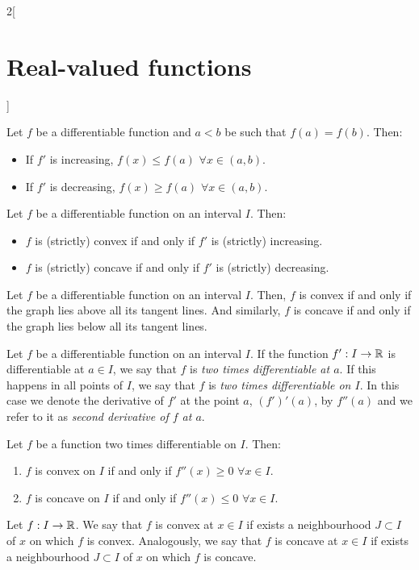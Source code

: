 \documentclass[../../../main.tex]{subfiles}
\begin{document}
\begin{multicols}{2}[\section{Real-valued functions}]
\begin{lemma}
    Let $f$ be a differentiable function and $a<b$ be such that $f(a)=f(b)$. Then:
    \begin{itemize}
      \item If $f'$ is increasing, $f(x)\leq f(a)$ $\forall x\in(a,b)$.
      \item If $f'$ is decreasing, $f(x)\geq f(a)$ $\forall x\in(a,b)$.
    \end{itemize}
  \end{lemma}
  \begin{theorem}
    Let $f$ be a differentiable function on an interval $I$. Then:
    \begin{itemize}
      \item $f$ is (strictly) convex if and only if $f'$ is (strictly) increasing.
      \item $f$ is (strictly) concave if and only if $f'$ is (strictly) decreasing.
    \end{itemize}
  \end{theorem}
  \begin{theorem}
    Let $f$ be a differentiable function on an interval $I$. Then, $f$ is convex if and only if the graph lies above all its tangent lines. And similarly, $f$ is concave if and only if the graph lies below all its tangent lines.
  \end{theorem}
  \begin{definition}\label{RVF_second-derivative}
    Let $f$ be a differentiable function on an interval $I$. If the function $f':I\rightarrow\mathbb{R}$ is differentiable at $a\in I$, we say that $f$ is \textit{two times differentiable at $a$}. If this happens in all points of $I$, we say that $f$ is \textit{two times differentiable on $I$}. In this case we denote the derivative of $f'$ at the point $a$, $(f')'(a)$, by $f''(a)$ and we refer to it as \textit{second derivative of $f$ at $a$}.
  \end{definition}
  \begin{theorem}
    Let $f$ be a function two times differentiable on $I$. Then:
    \begin{enumerate}
      \item $f$ is convex on $I$ if and only if $f''(x)\geq 0$ $\forall x\in I$.
      \item $f$ is concave on $I$ if and only if $f''(x)\leq 0$ $\forall x\in I$.
    \end{enumerate}
  \end{theorem}
  \begin{definition}
    Let $f:I\rightarrow\mathbb{R}$. We say that $f$ is convex at $x\in I$ if exists a neighbourhood $J\subset I$ of $x$ on which $f$ is convex. Analogously, we say that $f$ is concave at $x\in I$ if exists a neighbourhood $J\subset I$ of $x$ on which $f$ is concave.

\end{definition}
\end{multicols}
\end{document}
